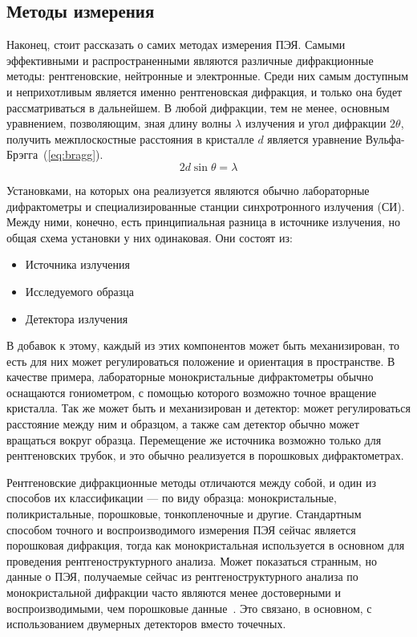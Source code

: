\subsection{Методы измерения}

Наконец, стоит рассказать о самих методах измерения ПЭЯ.
Самыми эффективными и распространенными являются различные дифракционные методы: рентгеновские, нейтронные и электронные.
Среди них самым доступным и неприхотливым является именно рентгеновская дифракция, и только она будет рассматриваться в дальнейшем.
В любой дифракции, тем не менее, основным уравнением, позволяющим, зная длину волны $\lambda$ излучения и угол дифракции $2\theta$, получить межплоскостные расстояния в кристалле $d$ является уравнение Вульфа-Брэгга~(\ref{eq:bragg}).
\begin{equation} \label{eq:bragg} 
    2 d \sin{\theta} = \lambda
\end{equation}

Установками, на которых она реализуется являются обычно лабораторные дифрактометры и специализированные станции синхротронного излучения (СИ).
Между ними, конечно, есть принципиальная разница в источнике излучения, но общая схема установки у них одинаковая.
Они состоят из:
\begin{itemize}
    \item Источника излучения
    \item Исследуемого образца
    \item Детектора излучения
\end{itemize}
В добавок к этому, каждый из этих компонентов может быть механизирован, то есть для них может регулироваться положение и ориентация в пространстве.
В качестве примера, лабораторные монокристальные дифрактометры обычно оснащаются гониометром, с помощью которого возможно точное вращение кристалла.
Так же может быть и механизирован и детектор: может регулироваться расстояние между ним и образцом, а также сам детектор обычно может вращаться вокруг образца.
Перемещение же источника возможно только для рентгеновских трубок, и это обычно реализуется в порошковых дифрактометрах.

Рентгеновские дифракционные методы отличаются между собой, и один из способов их классификации --- по виду образца: монокристальные, поликристальные, порошковые, тонкопленочные и другие.
Стандартным способом точного и воспроизводимого измерения ПЭЯ сейчас является порошковая дифракция, тогда как монокристальная используется в основном для проведения рентгеноструктурного анализа.
Может показаться странным, но данные о ПЭЯ, получаемые сейчас из рентгеноструктурного анализа по монокристальной дифракции часто являются менее достоверными и воспроизводимыми, чем порошковые данные~\cite{Dudka:2017}.
Это связано, в основном, с использованием двумерных детекторов вместо точечных.

